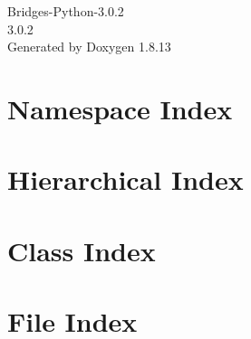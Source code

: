 \documentclass[twoside]{book}
\newcommand{\+}{\discretionary{\mbox{\scriptsize$\hookleftarrow$}}{}{}}
\newcommand{\clearemptydoublepage}{%
  \newpage{\pagestyle{empty}\cleardoublepage}%
}
\begin{document}
\hypersetup{pageanchor=false,
             bookmarksnumbered=true,
             pdfencoding=unicode
            }
\begin{titlepage}
\vspace*{7cm}
\begin{center}%
{\Large Bridges-\/\+Python-\/3.0.2 \\[1ex]\large 3.\+0.\+2 }\\
\vspace*{1cm}
{\large Generated by Doxygen 1.8.13}\\
\end{center}
\end{titlepage}
\clearemptydoublepage
{}
\tableofcontents
\clearemptydoublepage
{}
\hypersetup{pageanchor=true}

\chapter{Namespace Index}

\chapter{Hierarchical Index}

\chapter{Class Index}

\chapter{File Index}

\end{document}
